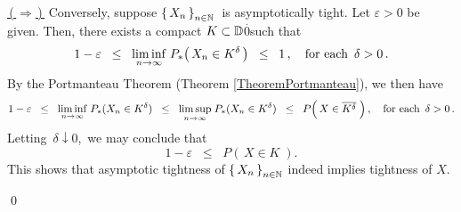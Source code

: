 \begin{enumerate}
	\vskip 0.5cm
	\underline{\,(\,$\Longrightarrow$\,)\,}\;\;
	Conversely, suppose $\left\{\,X_{n}\,\right\}_{n\in\mathbb{N}}$\, is asymptotically tight.
	Let $\varepsilon > 0$ be given.
	Then, there exists a compact $K \subset \mathbb{D}${\color{white}$\overset{.}{0}$}such that
	\begin{equation*}
	1 - \varepsilon
	\;\;\leq\;\;
		\underset{n\rightarrow\infty}{\liminf}\;P_{*}\!\left(\,X_{n} \in K^{\delta}\,\right)
	\;\;\leq\;\; 1\,,
	\quad
	\textnormal{for each \,$\delta > 0$}\,.
	\end{equation*}
	By the Portmanteau Theorem (Theorem \ref{TheoremPortmanteau}),
	we then have
	\begin{equation*}
	1 - \varepsilon
	\;\;\leq\;\;
		\underset{n\rightarrow\infty}{\liminf}\; P_{*}(X_{n} \in K^{\delta})
	\;\;\leq\;\;
		\underset{n\rightarrow\infty}{\limsup}\; P_{*}(X_{n} \in K^{\delta})
	\;\;\leq\;\;
		P\!\left(\,X \in \overline{K^{\delta}}\;\right),
	\quad
	\textnormal{for each \,$\delta > 0$}\,.
	\end{equation*}
	Letting \,$\delta \downarrow 0$,\, we may conclude that
	\begin{equation*}
	1 - \varepsilon \;\;\leq\;\; P\!\left(\,X \in K\;\right).
	\end{equation*}
	This shows that asymptotic tightness of $\left\{\,X_{n}\,\right\}_{n\in\mathbb{N}}$
	indeed implies tightness of $X$.
\end{enumerate}
\qed


